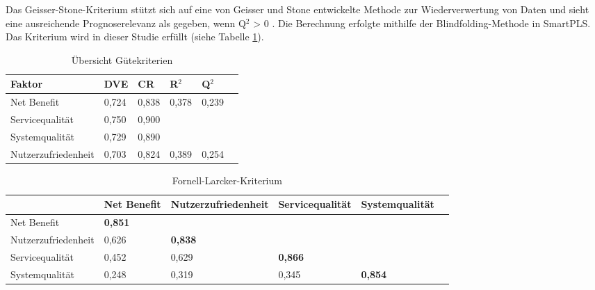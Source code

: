\nocite{geisser1974predictive}

Das Geisser-Stone-Kriterium stützt sich auf eine von Geisser und Stone entwickelte Methode zur Wiederverwertung von Daten und sieht eine ausreichende Prognoserelevanz als gegeben, wenn Q$^2$ > 0 \parencite[vgl.][S.35]{nitzl2010anwenderorientierte}. Die Berechnung erfolgte mithilfe der Blindfolding-Methode in SmartPLS. Das Kriterium wird in dieser Studie erfüllt (siehe Tabelle \ref{tab:Übersicht Gütekriterien}).
 

\begin{table}[h] 
\footnotesize
\caption{Übersicht Gütekriterien}
\label{tab:Übersicht Gütekriterien} 
\begin{tabular}{@{}llllll@{}} \toprule

\textbf{Faktor} & \textbf{DVE} & \textbf{CR} & \textbf{R$^2$} & \textbf{Q$^2$} \\ \midrule

 Net Benefit 		& 0,724 		& 0,838 		& 0,378 		& 0,239 		 \\
 
 Servicequalität 	& 0,750 		& 0,900 		& 			& 			 \\

 Systemqualität 	& 0,729 		& 0,890 		& 			& 			 \\

 Nutzerzufriedenheit & 0,703 	& 0,824 		& 0,389 		& 0,254		 \\ \bottomrule
\end{tabular}	
\end{table}



\begin{table}[h] 
\footnotesize
\caption{Fornell-Larcker-Kriterium}
\label{tab:Fornell-Larcker-Kriterium} 
\begin{tabular}{@{}llllll@{}} \toprule

 & \textbf{Net Benefit} & \textbf{Nutzerzufriedenheit} & \textbf{Servicequalität} & \textbf{Systemqualität} \\ \midrule

 Net Benefit 			& \textbf{0,851}		& 			& 		&  		\\
 
 Nutzerzufriedenheit 	& 0,626 		& \textbf{0,838}		& 		& 			\\

 Servicequalität 		& 0,452 		& 0,629 		& \textbf{0,866}	& 		 \\

 Systemqualität 		& 0,248 		& 0,319 		& 0,345 	& \textbf{0,854} \\ 
 
 \bottomrule
\end{tabular}	
\end{table}


